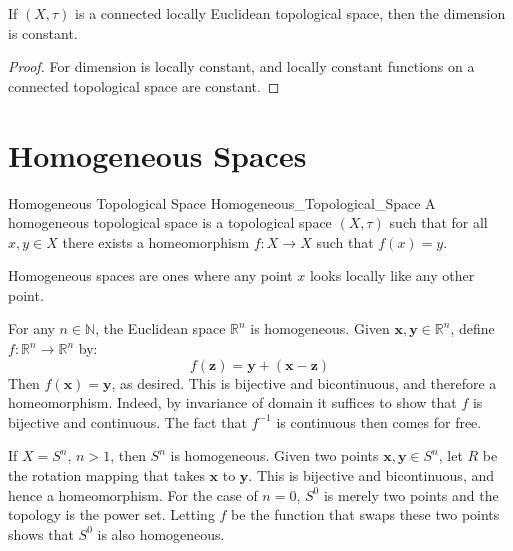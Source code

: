 \documentclass{article}                                                        %
\begin{document}
        \begin{theorem}
                If $(X,\tau)$ is a connected locally Euclidean topological
                space, then the dimension is constant.
        \end{theorem}
        \begin{proof}
                For dimension is locally constant, and locally constant
                functions on a connected topological space are constant.
        \end{proof}
    \section{Homogeneous Spaces}
        \begin{fdefinition}{Homogeneous Topological Space}
                               {Homogeneous_Topological_Space}
                A homogeneous topological space is a topological space
                $(X,\tau)$ such that for all $x,y\in{X}$ there exists a
                homeomorphism $f:X\rightarrow{X}$ such that $f(x)=y$.
        \end{fdefinition}
        Homogeneous spaces are ones where any point $x$ looks locally like
        any other point.
        \begin{example}
                For any $n\in\mathbb{N}$, the Euclidean space $\mathbb{R}^{n}$
                is homogeneous. Given $\mathbf{x},\mathbf{y}\in\mathbb{R}^{n}$,
                define $f:\mathbb{R}^{n}\rightarrow\mathbb{R}^{n}$ by:
                \begin{equation}
                    f(\mathbf{z})=\mathbf{y}+(\mathbf{x}-\mathbf{z})
                \end{equation}
                Then $f(\mathbf{x})=\mathbf{y}$, as desired. This is bijective
                and bicontinuous, and therefore a homeomorphism. Indeed, by
                invariance of domain it suffices to show that $f$ is bijective
                and continuous. The fact that $f^{\minus{1}}$ is continuous then
                comes for free.
        \end{example}
        \begin{example}
                If $X=S^{n}$, $n>1$, then $S^{n}$ is homogeneous. Given two
                points $\mathbf{x},\mathbf{y}\in{S}^{n}$, let $R$ be the
                rotation mapping that takes $\mathbf{x}$ to $\mathbf{y}$. This
                is bijective and bicontinuous, and hence a homeomorphism. For
                the case of $n=0$, $S^{0}$ is merely two points and the topology
                is the power set. Letting $f$ be the function that swaps these
                two points shows that $S^{0}$ is also homogeneous.
        \end{example}
\end{document}
